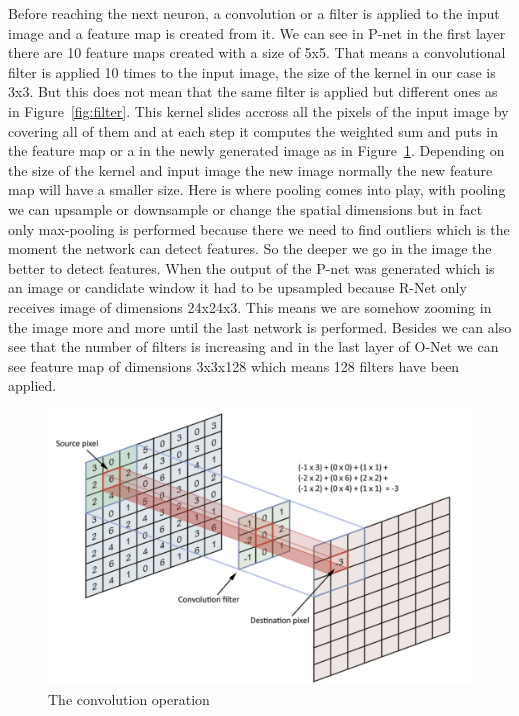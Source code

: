 Before reaching the next neuron, a convolution or a filter is applied to the input image and a feature map is created from it. We can see in P-net in the first layer there are 10 feature maps created with a size of 5x5. That means a convolutional filter is applied 10 times to the input image, the size of the kernel in our case is 3x3. But this does not mean that the same filter is applied but different ones as in Figure~\ref{fig:filter}. This kernel slides accross all the pixels of the input image by covering all of them and at each step it computes the weighted sum and puts in the feature map or a in the newly generated image as in Figure~\ref{fig:conv}. Depending on the size of the kernel and input image the new image normally the new feature map will have a smaller size. Here is where pooling comes into play, with pooling we can upsample or downsample or change the spatial dimensions but in fact only max-pooling is performed because there we need to find outliers which is the moment the network can detect features. So the deeper we go in the image the better to detect features. When the output of the P-net was generated which is an image or candidate window it had to be upsampled because R-Net only receives image of dimensions 24x24x3. This means we are somehow zooming in the image more and more until the last network is performed. Besides we can also see that the number of filters is increasing and in the last layer of O-Net we can see feature map of dimensions 3x3x128 which means 128 filters have been applied. 
\begin{figure}[!htb]
    \centering
    \includegraphics[width=1\textwidth]{figures/convolution.png}
    \caption{The convolution operation}
    \label{fig:conv}
\end{figure}


